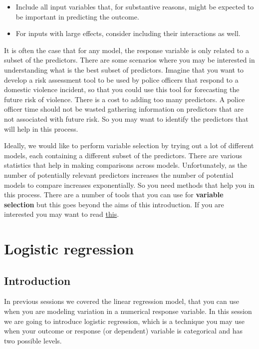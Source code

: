 \documentclass[
]{book}
\begin{document}
\begin{itemize}
\item
  Include all input variables that, for substantive reasons, might be expected to be important in predicting the outcome.
\item
  For inputs with large effects, consider including their interactions as well.
\end{itemize}

It is often the case that for any model, the response variable is only related to a subset of the predictors. There are some scenarios where you may be interested in understanding what is the best subset of predictors. Imagine that you want to develop a risk assessment tool to be used by police officers that respond to a domestic violence incident, so that you could use this tool for forecasting the future risk of violence. There is a cost to adding too many predictors. A police officer time should not be wasted gathering information on predictors that are not associated with future risk. So you may want to identify the predictors that will help in this process.

Ideally, we would like to perform variable selection by trying out a lot of different models, each containing a different subset of the predictors. There are various statistics that help in making comparisons across models. Unfortunately, as the number of potentially relevant predictors increases the number of potential models to compare increases exponentially. So you need methods that help you in this process. There are a number of tools that you can use for \textbf{variable selection} but this goes beyond the aims of this introduction. If you are interested you may want to read \href{http://link.springer.com/chapter/10.1007/978-1-4614-7138-7_6}{this}.

\hypertarget{logistic-regression}{%
\chapter{Logistic regression}\label{logistic-regression}}

\hypertarget{introduction-3}{%
\section{Introduction}\label{introduction-3}}

In previous sessions we covered the linear regression model, that you can use when you are modeling variation in a numerical response variable. In this session we are going to introduce logistic regression, which is a technique you may use when your outcome or response (or dependent) variable is categorical and has two possible levels.
\end{document}
